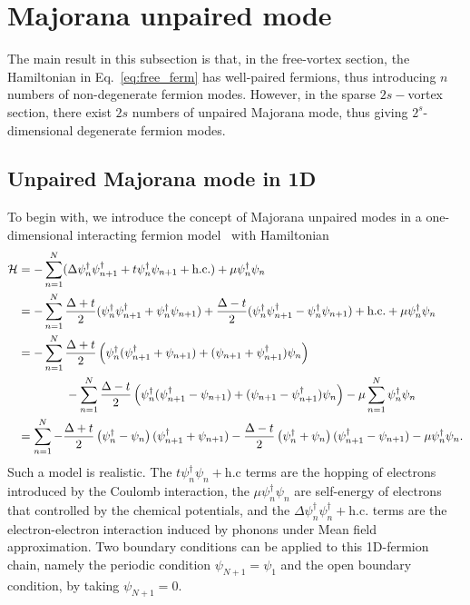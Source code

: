 \section{Majorana unpaired mode}
The main result in this subsection is that,  in the free-vortex section, the Hamiltonian in Eq.~\eqref{eq:free_ferm} has well-paired fermions, thus introducing $n$ numbers of non-degenerate fermion modes. However, in the sparse $2s-$vortex section, there exist $2s$ numbers of unpaired Majorana mode, thus giving $ 2^s$-dimensional degenerate fermion modes.
\subsection{Unpaired Majorana mode in 1D}
To begin with, we introduce the concept of Majorana unpaired modes in a one-dimensional interacting fermion model~\cite{Kitaev_2001} with Hamiltonian
\begin{align}
    \mathcal{H} &=- \sum_{n= 1}^{N}(\Delta \psi_n^\dagger \psi_{n+1}^\dagger + t\psi_{n}^\dagger \psi_{n+1}+\text{h.c.})+\mu\psi_n^\dagger \psi_n\\
    &=- \sum_{n= 1}^{N} \frac{\Delta + t}{2}(\psi_n^\dagger \psi_{n+1}^\dagger +\psi_{n}^\dagger \psi_{n+1}) + \frac{\Delta - t}{2}(\psi_n^\dagger \psi_{n+1}^\dagger -\psi_{n}^\dagger \psi_{n+1})+\text{h.c.}+\mu\psi_n^\dagger \psi_n\\
    &=-\sum_{n = 1}^{N}\frac{\Delta + t}{2} \left(\psi_n^\dagger (\psi_{n+1}^\dagger + \psi_{n+1})+(\psi_{n+1} +  \psi_{n+1}^\dagger)\psi_{n}\right) \notag \\
    &\quad\quad\quad\quad -\sum_{n = 1}^{N}\frac{\Delta - t}{2} \left(\psi_n^\dagger (\psi_{n+1}^\dagger - \psi_{n+1})+(\psi_{n+1} -  \psi_{n+1}^\dagger)\psi_{n}\right)-\mu \sum_{n =1}^N\psi_n^\dagger \psi_n\\
    &=\sum_{n = 1}^{N}-\frac{\Delta+t}{2} \left(\psi_n^\dagger- \psi_{n}\right) (\psi_{n+1}^\dagger +  \psi_{n+1}) -\frac{\Delta-t}{2} \left(\psi_n^\dagger+ \psi_{n}\right) (\psi_{n+1}^\dagger -  \psi_{n+1})-\mu \psi_n^\dagger \psi_n.
\end{align}
Such a model is realistic. The $t\psi_n^\dagger \psi_n + \text{h.c}$  terms are the hopping of electrons introduced by the Coulomb interaction, the $\mu \psi_n^\dagger \psi_n$  are self-energy of electrons that controlled by the chemical potentials, and the $\Delta\psi_n^\dagger \psi_n^\dagger + \text{h.c.}$ terms are the  electron-electron interaction induced by phonons under Mean field approximation. 
Two boundary conditions can be applied to this 1D-fermion chain, namely the periodic condition  $\psi_{N+1} = \psi_{1}$ and the open boundary condition, by taking $\psi_{N+1} = 0$.

